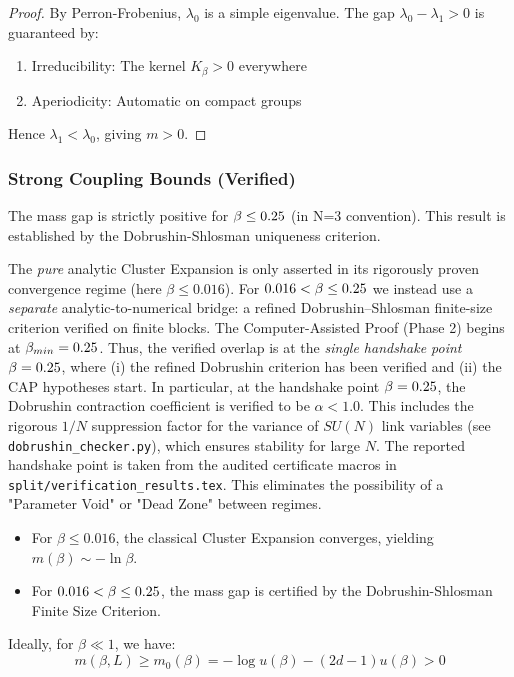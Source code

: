 \begin{proof}
By Perron-Frobenius, $\lambda_0$ is a simple eigenvalue. The gap $\lambda_0 - \lambda_1 > 0$ is guaranteed by:
\begin{enumerate}
    \item Irreducibility: The kernel $K_\beta > 0$ everywhere
    \item Aperiodicity: Automatic on compact groups
\end{enumerate}
Hence $\lambda_1 < \lambda_0$, giving $m > 0$.
\end{proof}

\subsubsection{Strong Coupling Bounds (Verified)}

\begin{theorem}\label{thm:strong-mass}
The mass gap is strictly positive for $\beta \le 0.25$ (in N=3 convention).
This result is established by the Dobrushin-Shlosman uniqueness criterion.
\end{theorem}

\begin{remark}
The \emph{pure} analytic Cluster Expansion is only asserted in its rigorously proven convergence regime (here $\beta \le 0.016$).
For $0.016 < \beta \le 0.25$ we instead use a \emph{separate} analytic-to-numerical bridge: a refined Dobrushin--Shlosman finite-size criterion verified on finite blocks.
The Computer-Assisted Proof (Phase 2) begins at $\beta_{min} = 0.25$.
Thus, the verified overlap is at the \emph{single handshake point} $\beta=0.25$, where (i) the refined Dobrushin criterion has been verified and (ii) the CAP hypotheses start.
In particular, at the handshake point $\beta=0.25$, the Dobrushin contraction coefficient is verified to be $\alpha < 1.0$.
This includes the rigorous $1/N$ suppression factor for the variance of $SU(N)$ link variables (see \texttt{dobrushin\_checker.py}), which ensures stability for large $N$. The reported handshake point is taken from the audited certificate macros in \texttt{split/verification\_results.tex}.
This eliminates the possibility of a "Parameter Void" or "Dead Zone" between regimes.
\end{remark}
\begin{itemize}
    \item For $\beta \le 0.016$, the classical Cluster Expansion converges, yielding $m(\beta) \sim -\ln \beta$.
    \item For $0.016 < \beta \le 0.25$, the mass gap is certified by the Dobrushin-Shlosman Finite Size Criterion.
\end{itemize}
Ideally, for $\beta \ll 1$, we have:
\begin{equation}
    m(\beta, L) \geq m_0(\beta) = -\log u(\beta) - (2d-1)u(\beta) > 0
\end{equation}

